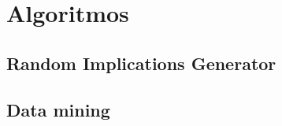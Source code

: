 \section{Algoritmos}

%






\clearpage


\clearpage


\subsection{Random Implications Generator}
\clearpage

\subsection{Data mining}
\clearpage



\newpage
\thispagestyle{empty}
\mbox{}


\newpage